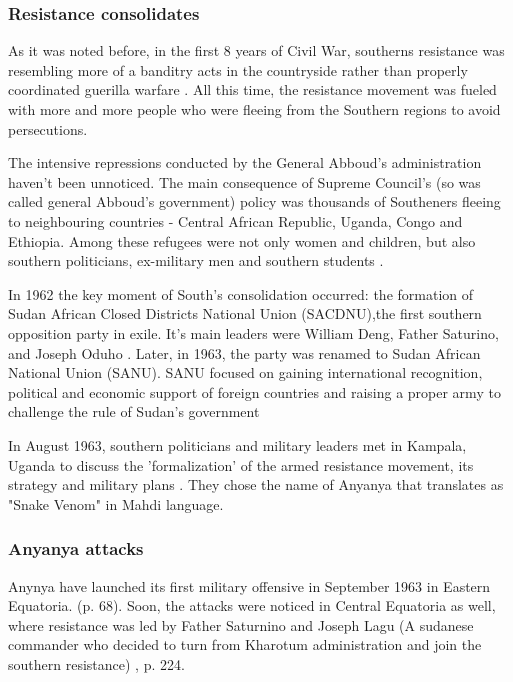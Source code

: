 \documentclass[14pt,a4paper]{article}
\begin{document}
\subsubsection{Resistance consolidates}

As it was noted before, in the first 8 years of Civil War, southerns resistance was resembling more of a banditry acts in the countryside rather than properly coordinated guerilla warfare \cite{o1977secret}. All this time, the resistance movement was fueled with more and more people who were fleeing from the Southern regions to avoid persecutions.

The intensive repressions conducted by the General Abboud's administration haven't been unnoticed. The main consequence of Supreme Council's (so was called general Abboud's government) policy was thousands of Southeners fleeing to neighbouring countries - Central African Republic, Uganda, Congo and Ethiopia. Among these refugees were not only women and children, but also southern politicians, ex-military men and southern students \cite{poggo2008first}. 

In 1962 the key moment of South's consolidation occurred: the formation of Sudan African Closed Districts National Union (SACDNU),the first southern opposition party in exile. It's main leaders were William Deng, Father Saturino, and Joseph Oduho \cite{rolandsen2011making}. Later, in 1963, the party was renamed to Sudan African National Union (SANU). SANU focused on gaining international recognition, political and economic support of foreign countries and raising a proper army to challenge the rule of Sudan's government \cite{rolandsen2011making}

In August 1963, southern politicians and military leaders met in Kampala, Uganda to discuss the 'formalization' of the armed resistance movement, its strategy and military plans \cite{poggo2008first}. They chose the name of Anyanya that translates as "Snake Venom" in Mahdi language. 

\subsubsection{Anyanya attacks}

Anynya have launched its first military offensive in September 1963 in Eastern Equatoria. \cite{poggo2008first} (p. 68). Soon, the attacks were noticed in Central Equatoria as well, where resistance was led by Father Saturnino and Joseph Lagu (A sudanese commander who decided to turn from Kharotum administration and join the southern resistance) \cite{rolandsen2011making}, p. 224. 
\end{document}
